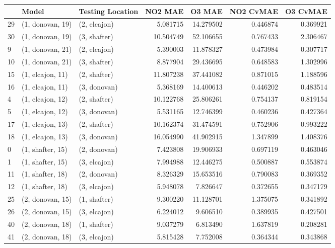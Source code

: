 \begin{tabular}{lllrrrr}
\toprule
{} &             Model & Testing Location &    NO2 MAE &     O3 MAE &  NO2 CvMAE &  O3 CvMAE \\
\midrule
29 &  (1, donovan, 19) &     (2, elcajon) &   5.081715 &  14.279502 &   0.446874 &  0.369921 \\
30 &  (1, donovan, 19) &     (3, shafter) &  10.504749 &  52.106655 &   0.767433 &  2.306467 \\
9  &  (1, donovan, 21) &     (2, elcajon) &   5.390003 &  11.878327 &   0.473984 &  0.307717 \\
10 &  (1, donovan, 21) &     (3, shafter) &   8.877904 &  29.436695 &   0.648583 &  1.302996 \\
15 &  (1, elcajon, 11) &     (2, shafter) &  11.807238 &  37.441082 &   0.871015 &  1.188596 \\
16 &  (1, elcajon, 11) &     (3, donovan) &   5.368169 &  14.400613 &   0.446202 &  0.483514 \\
4  &  (1, elcajon, 12) &     (2, shafter) &  10.122768 &  25.806261 &   0.754137 &  0.819154 \\
5  &  (1, elcajon, 12) &     (3, donovan) &   5.531165 &  12.746399 &   0.460236 &  0.427364 \\
17 &  (1, elcajon, 13) &     (2, shafter) &  10.162374 &  31.474591 &   0.752906 &  0.993222 \\
18 &  (1, elcajon, 13) &     (3, donovan) &  16.054990 &  41.902915 &   1.347899 &  1.408376 \\
0  &  (1, shafter, 15) &     (2, donovan) &   7.423808 &  19.906933 &   0.697119 &  0.463046 \\
1  &  (1, shafter, 15) &     (3, elcajon) &   7.994988 &  12.446275 &   0.500887 &  0.553874 \\
11 &  (1, shafter, 18) &     (2, donovan) &   8.326329 &  15.653516 &   0.790083 &  0.369352 \\
12 &  (1, shafter, 18) &     (3, elcajon) &   5.948078 &   7.826647 &   0.372655 &  0.347179 \\
25 &  (2, donovan, 15) &     (1, shafter) &   9.300220 &  11.128701 &   1.375075 &  0.341892 \\
26 &  (2, donovan, 15) &     (3, elcajon) &   6.224012 &   9.606510 &   0.389935 &  0.427501 \\
40 &  (2, donovan, 18) &     (1, shafter) &   9.037279 &   6.813490 &   1.637819 &  0.208281 \\
41 &  (2, donovan, 18) &     (3, elcajon) &   5.815428 &   7.752008 &   0.364344 &  0.343868 \\

\end{tabular}
